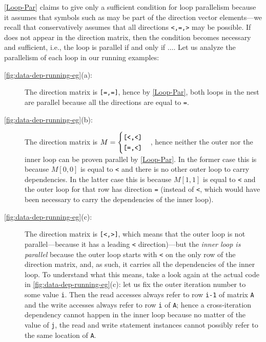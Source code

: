 \documentclass[acmsmall,review]{acmart}\settopmatter{printfolios=true,printccs=false,printacmref=false}
\begin{document}
\cref{Loop-Par} claims to give only a sufficient condition for 
loop parallelism because it assumes that symbols such as {\tt *}
may be part of the direction vector elements---we recall that
{\tt *} conservatively assumes that all directions {\tt <,=,>}
may be possible. If {\tt *} does not appear in the direction
matrix, then the condition becomes necessary and sufficient,
i.e., the loop is parallel if and only if $\ldots$.
Let us analyze the parallelism of each loop in our running
examples:
\begin{description}
\item[\cref{fig:data-dep-running-eg}(a):] The direction matrix
        is {\tt [=,=]}, hence by \cref{Loop-Par}, both loops
        in the nest are parallel because all the directions
        are equal to {\tt=}.
\item[\cref{fig:data-dep-running-eg}(b):] The direction matrix is
        $M = \begin{cases}\mbox{\tt[<,<]}\\\mbox{\tt[=,<]}\end{cases}$,
        hence neither the outer nor the inner loop can 
        be proven parallel by \cref{Loop-Par}. In the former case
        this is because $M[0,0]$ is equal to {\tt<} and there is 
        no other outer loop to carry dependencies. In the latter 
        case this is because $M[1,1]$ is equal to {\tt<} and the 
        outer loop for that row has direction 
        {\tt=} (instead of {\tt<}, which would have been necessary 
        to carry the dependencies of the inner loop).
\item[\cref{fig:data-dep-running-eg}(c):] The direction matrix is
        {\tt[<,>]}, which means that the outer loop is not 
        parallel---because it has a leading {\tt<} direction)---but 
        the {\em inner loop is parallel}
        because the outer loop starts with {\tt<} on the only row
        of the direction matrix, and, as such, it carries all the
        dependencies of the inner loop.   To understand what this
        means, take a look again at the actual code in
        \cref{fig:data-dep-running-eg}(c): let us fix the outer
        iteration number to some value {\tt i}. Then the read accesses
        always refer to row {\tt i-1} of matrix {\tt A} and the write 
        accesses always refer to row {\tt i} of {\tt A}; hence a
        cross-iteration dependency cannot happen in the inner loop 
        because no matter of the value of {\tt j}, the read and write
        statement instances cannot possibly refer to the same  
        location of {\tt A}.
\end{description}
\end{document}
